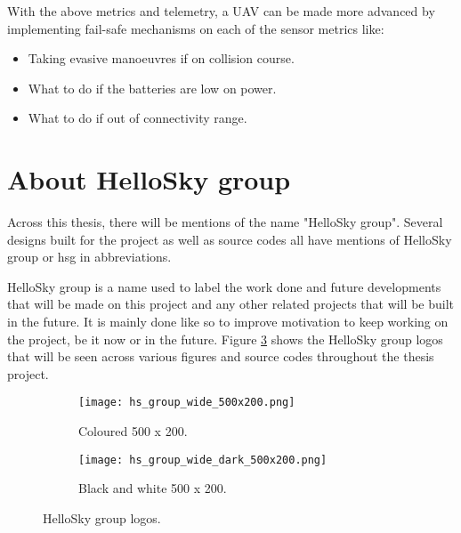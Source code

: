 With the above metrics and telemetry, a UAV can be made more advanced by implementing fail-safe mechanisms on each of the sensor metrics like:
\begin{itemize}
    \item Taking evasive manoeuvres if on collision course.
    \item What to do if the batteries are low on power.
    \item What to do if out of connectivity range.
\end{itemize}




\section{About HelloSky group}
\label{sec:about-hellosky-group}

Across this thesis, there will be mentions of the name "HelloSky group". Several designs built for the project as well as source codes all have mentions of HelloSky group or hsg in abbreviations.

HelloSky group is a name used to label the work done and future developments that will be made on this project and any other related projects that will be built in the future. It is mainly done like so to improve motivation to keep working on the project, be it now or in the future. Figure \ref{fig:hs-group-logos} shows the HelloSky group logos that will be seen across various figures and source codes throughout the thesis project.

\begin{figure}[!htbp]
    \centering
    \begin{subfigure}{0.4\textwidth}
        \texttt{[image: hs\_group\_wide\_500x200.png]}
        \caption{Coloured 500 x 200.}
        \label{fig:hs-group-wide-500x200}
    \end{subfigure}
    \hspace*{\fill}
    \begin{subfigure}{0.4\textwidth}
        \texttt{[image: hs\_group\_wide\_dark\_500x200.png]}
        \caption{Black and white 500 x 200.}
        \label{fig:hs-group-wide-dark-500x200}
    \end{subfigure}
    \caption{HelloSky group logos.}
    \label{fig:hs-group-logos}
\end{figure}

